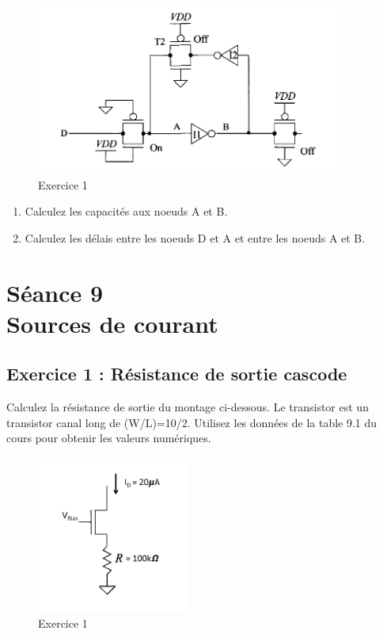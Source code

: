 \documentclass[paper=a4, fontsize=11pt]{article} %
\numberwithin{equation}{section} %
\numberwithin{figure}{section} %
\numberwithin{table}{section} %
\begin{document}
\begin{figure}[!htbp]
   \centering
   \includegraphics[width=10cm]{figure/fig8-4.png}
   \caption{Exercice 1}
   \label{fig8-4}
\end{figure}

\begin{enumerate}
\item Calculez les capacités aux noeuds A et B.
\item Calculez les délais entre les noeuds D et A et entre les noeuds A et B.
\end{enumerate}







\newpage
\setcounter{figure}{0}
\setcounter{section}{9}
\section{Séance 9\\Sources de courant}
\subsection*{Exercice 1 : Résistance de sortie cascode}
Calculez la résistance de sortie du montage ci-dessous. Le transistor est un transistor canal long de (W/L)=10/2. Utilisez les données de la table 9.1 du cours pour obtenir les valeurs numériques.

\begin{figure}[!htbp]
   \centering
   \includegraphics[width=5cm]{figure/fig10-1.png}
   \caption{Exercice 1}
   \label{fig10-1}
\end{figure}
\end{document}
